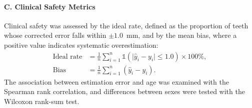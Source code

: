 \paragraph{C. Clinical Safety Metrics}
Clinical safety was assessed by the ideal rate, defined as the proportion of
teeth whose corrected error falls within $\pm1.0$~mm, and by the mean bias,
where a positive value indicates systematic overestimation:
\begin{align}
\text{Ideal rate} &= \frac{1}{n}\sum_{i=1}^{n}\mathbb{1}\left(\lvert \hat{y}_i - y_i \rvert \le 1.0\right)\times 100\%, \\
\text{Bias} &= \frac{1}{n}\sum_{i=1}^{n}(\hat{y}_i - y_i).
\end{align}
The association between estimation error and age was examined with the
Spearman rank correlation, and differences between sexes were tested with the
Wilcoxon rank-sum test.
